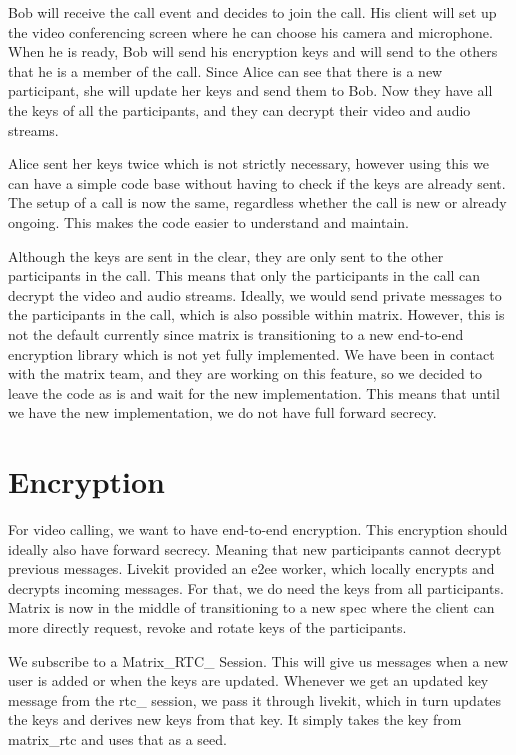 \documentclass{report}
\begin{document}
    Bob will receive the call event and decides to join the call. His client will set up the video conferencing
    screen where he can choose his camera and microphone. When he is ready, Bob will send his encryption keys and will
    send to the others that he is a member of the call. Since Alice can see that there is a new participant, she will
    update her keys and send them to Bob. Now they have all the keys of all the participants, and they can decrypt their
    video and audio streams.

    Alice sent her keys twice which is not strictly necessary, however using this we can have a simple code base
    without having to check if the keys are already sent. The setup of a call is now the same, regardless whether
    the call is new or already ongoing. This makes the code easier to understand and maintain.

    Although the keys are sent in the clear, they are only sent to the other participants in the call. This means that
    only the participants in the call can decrypt the video and audio streams. Ideally, we would send private
    messages to the participants in the call, which is also possible within matrix. However, this is not the default
    currently since matrix is transitioning to a new end-to-end encryption library which is not yet fully implemented.
    We have been in contact with the matrix team, and they are working on this feature, so we decided to leave the code
    as is and wait for the new implementation. This means that until we have the new implementation, we do not have
    full forward secrecy.



    \section{Encryption}

    For video calling, we want to have end-to-end encryption. This encryption should ideally also have forward secrecy.
    Meaning that new participants cannot decrypt previous messages. Livekit provided an e2ee worker, which locally
    encrypts and decrypts incoming messages. For that, we do need the keys from all participants. Matrix is now in the
    middle of transitioning to a new spec where the client can more directly request, revoke and rotate keys of the
    participants.

    We subscribe to a Matrix\_RTC\_
    Session. This will give us messages when a new user is added or when the keys are updated. Whenever we get an
    updated key message from the rtc\_
    session, we pass it through livekit, which in turn updates the keys and derives new keys from that key. It simply
    takes the key from matrix\_rtc and uses that as a seed.
\end{document}
